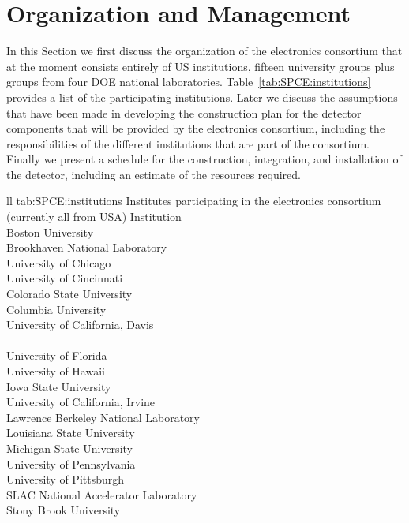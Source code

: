 \section{Organization and Management}
\label{sec:fdsp-tpcelec-management}

In this Section we first discuss the organization of the  electronics
consortium that at the moment consists entirely of US institutions, 
fifteen university groups plus groups from four DOE national 
laboratories. Table~\ref{tab:SPCE:institutions} provides a list 
of the participating institutions.
Later we discuss the assumptions that have been made in developing
the construction plan for the detector components that will be
provided by the  electronics consortium, including the responsibilities
of the different institutions that are part of the consortium. Finally
we present a schedule for the construction, integration, and installation
of the detector, including an estimate of the resources required.

\begin{dunetable}
{ll}
{tab:SPCE:institutions}
{Institutes participating in the  electronics consortium (currently all from USA)}
Institution  \\ \toprowrule
Boston University \\ \colhline
Brookhaven National Laboratory \\ \colhline
University of Chicago \\ \colhline
University of Cincinnati \\ \colhline
Colorado State University  \\ \colhline
Columbia University \\ \colhline
University of California, Davis \\ \colhline
{} \\ \colhline
University of Florida \\ \colhline
University of Hawaii \\ \colhline
Iowa State University \\ \colhline
University of California, Irvine \\ \colhline
Lawrence Berkeley National Laboratory \\ \colhline
Louisiana State University \\ \colhline
Michigan State University \\ \colhline
University of Pennsylvania \\ \colhline
University of Pittsburgh \\ \colhline
SLAC National Accelerator Laboratory \\ \colhline
Stony Brook University \\
\end{dunetable}

